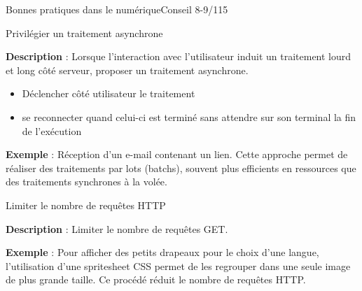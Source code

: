 \begin{frame}{Bonnes pratiques dans le numérique}{Conseil 8-9/115}

\begin{block}{Privilégier un traitement asynchrone}

\textbf{Description} :
Lorsque l’interaction avec l’utilisateur induit un traitement lourd et long côté serveur, proposer un traitement asynchrone.

\begin{itemize}
    \item Déclencher côté utilisateur le traitement
    \item se reconnecter quand celui-ci est terminé sans attendre sur son terminal la fin de l'exécution 
\end{itemize}


\textbf{Exemple} : Réception d’un e-mail contenant un lien. Cette approche permet de réaliser des traitements par lots (batchs), souvent plus efficients en ressources que des traitements synchrones à la volée.
\end{block}


\begin{block}{Limiter le nombre de requêtes HTTP}

\textbf{Description} :
Limiter le nombre de requêtes GET.


\textbf{Exemple} : Pour afficher des petits drapeaux pour le choix d'une langue, l'utilisation d'une spritesheet CSS permet de les regrouper dans une seule image de plus grande taille. Ce procédé réduit le nombre de requêtes HTTP.
\end{block}

\end{frame}



